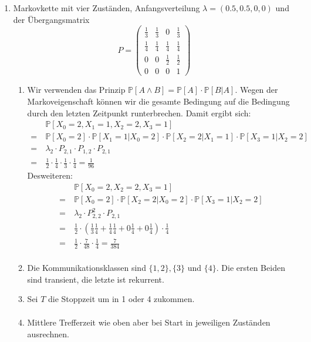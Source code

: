\documentclass[a4paper,11pt,notitlepage,fullpage]{article}
\newcommand{\pp}[1]{\mathbb P\left[#1\right]}
\begin{document}
\begin{enumerate}
\item Markovkette mit vier Zuständen, Anfangsverteilung $\lambda = (0.5, 0.5, 0, 0)$ und der Übergangsmatrix
$$P=\begin{pmatrix}
\frac{1}{3} & \frac{1}{3} & 0 & \frac{1}{3} \\
\frac{1}{4} & \frac{1}{4} & \frac{1}{4} & \frac{1}{4} \\
0 & 0 & \frac{1}{2} & \frac{1}{2} \\
0 & 0 & 0 & 1
\end{pmatrix}$$
\begin{enumerate}
\item Wir verwenden das Prinzip $\pp{A \wedge B} = \pp{A} \cdot \pp{B|A}$. Wegen der Markoveigenschaft können wir die gesamte Bedingung auf die Bedingung durch den letzten Zeitpunkt runterbrechen. Damit ergibt sich:
\begin{align*}
&\pp{X_0 = 2, X_1 = 1, X_2 = 2, X_3 = 1} \\
=~&\pp{X_0 = 2} \cdot \pp{X_1 = 1 | X_0 = 2} \cdot \pp{X_2 = 2 | X_1 = 1} \cdot \pp{X_3 = 1 | X_2 = 2} \\
=~&\lambda_2 \cdot P_{2, 1} \cdot P_{1, 2} \cdot P_{2, 1} \\
=~&\frac{1}{2} \cdot \frac{1}{4} \cdot \frac{1}{3} \cdot \frac{1}{4} = \frac{1}{96}
\end{align*}
Desweiteren:
\begin{align*}
&\pp{X_0 = 2, X_2 = 2, X_3 = 1} \\
=~&\pp{X_0 = 2} \cdot \pp{X_2 = 2 | X_0 = 2} \cdot \pp{X_3 = 1 | X_2 = 2} \\
=~&\lambda_2 \cdot P^2_{2, 2} \cdot P_{2, 1} \\
=~&\frac{1}{2} \cdot (\frac{1}{3}\frac{1}{4} + \frac{1}{4}\frac{1}{4} + 0 \frac{1}{4}+ 0 \frac{1}{4}) \cdot \frac{1}{4} \\
=~&\frac{1}{2} \cdot \frac{7}{48} \cdot \frac{1}{4}  = \frac{7}{384}\\
\end{align*}

\item Die Kommunikationsklassen sind $\{1, 2\}, \{3\}$ und $\{4\}$. Die ersten Beiden sind transient, die letzte ist rekurrent.

\item Sei $T$ die Stoppzeit um in 1 oder 4 zukommen.
\begin{align*}
\end{align*}

\item Mittlere Trefferzeit wie oben aber bei Start in jeweiligen Zuständen ausrechnen.
\begin{align*}
\end{align*}


\end{enumerate}
\end{enumerate}
\end{document}
